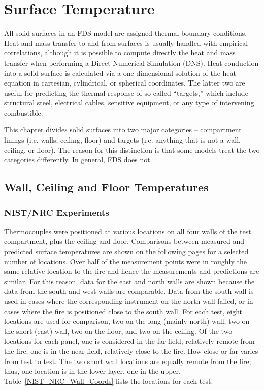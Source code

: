 \chapter{Surface Temperature}

All solid surfaces in an FDS model are assigned thermal boundary conditions. Heat and mass transfer to and from surfaces is usually handled with empirical correlations, although it is possible to compute directly the heat and mass transfer when performing a Direct Numerical Simulation (DNS). Heat conduction into a solid surface is calculated via a one-dimensional solution of the heat equation in cartesian, cylindrical, or spherical coordinates. The latter two are useful for predicting the thermal response of so-called ``targets,'' which include structural steel, electrical cables, sensitive equipment, or any type of intervening combustible.

This chapter divides solid surfaces into two major categories -- compartment linings (i.e. walls, ceiling, floor) and targets (i.e. anything that is not a wall, ceiling, or floor). The reason for this distinction is that some models treat the two categories differently. In general, FDS does not.


\section{Wall, Ceiling and Floor Temperatures}


\subsection{NIST/NRC Experiments}

Thermocouples were positioned at various locations on all four walls of the test compartment, plus the ceiling and floor. Comparisons between measured and predicted surface temperatures are shown on the following pages for a selected number of locations. Over half of the measurement points were in roughly the same relative location to the fire and hence the measurements and predictions are similar. For this reason, data for the east and north walls are shown because the data from the south and west walls are comparable. Data from the south wall is used in cases where the corresponding instrument on the north wall failed, or in cases where the fire is positioned close to the south wall. For each test, eight locations are used for comparison, two on the long (mainly north) wall, two on the short (east) wall, two on the floor, and two on the ceiling. Of the two locations for each panel, one is considered in the far-field, relatively remote from the fire; one is in the near-field, relatively close to the fire.  How close or far varies from test to test. The two short wall locations are equally remote from the fire; thus, one location is in the lower layer, one in the upper. Table~\ref{NIST_NRC_Wall_Coords} lists the locations for each test.

